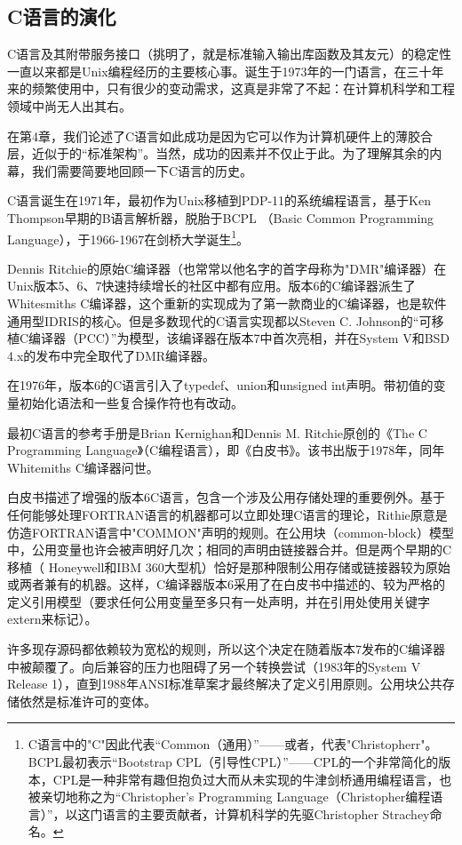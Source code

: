 \documentclass[12pt,oneside]{book}
\begin{document}
\begin{common-format}
\section{C语言的演化}
C语言及其附带服务接口（挑明了，就是标准输入输出库函数及其友元）的稳定性一直以来都是Unix编程经历的主要核心事。诞生于1973年的一门语言，在三十年来的频繁使用中，只有很少的变动需求，这真是非常了不起：在计算机科学和工程领域中尚无人出其右。

在第4章，我们论述了C语言如此成功是因为它可以作为计算机硬件上的薄胶合层，近似于\cite{BlaauwBrooks}的“标准架构”。当然，成功的因素并不仅止于此。为了理解其余的内幕，我们需要简要地回顾一下C语言的历史。

C语言诞生在1971年，最初作为Unix移植到PDP-11的系统编程语言，基于Ken Thompson早期的B语言解析器，脱胎于BCPL （Basic Common Programming Language），于1966-1967在剑桥大学诞生\footnote{C语言中的"C"因此代表“Common（通用）”——或者，代表"Christopherr"。BCPL最初表示“Bootstrap CPL（引导性CPL）”——CPL的一个非常简化的版本，CPL是一种非常有趣但抱负过大而从未实现的牛津剑桥通用编程语言，也被亲切地称之为“Christopher's Programming Language（Christopher编程语言）”，以这门语言的主要贡献者，计算机科学的先驱Christopher Strachey命名。}。

Dennis Ritchie的原始C编译器（也常常以他名字的首字母称为"DMR"编译器）在Unix版本5、6、7快速持续增长的社区中都有应用。版本6的C编译器派生了Whitesmiths C编译器，这个重新的实现成为了第一款商业的C编译器，也是软件通用型IDRIS的核心。但是多数现代的C语言实现都以Steven C. Johnson的“可移植C编译器（PCC）”为模型，该编译器在版本7中首次亮相，并在System V和BSD 4.x的发布中完全取代了DMR编译器。

在1976年，版本6的C语言引入了typedef、union和unsigned int声明。带初值的变量初始化语法和一些复合操作符也有改动。

最初C语言的参考手册是Brian Kernighan和Dennis M. Ritchie原创的《The C Programming Language》（C编程语言），即《白皮书》\cite{Kernighan-Ritchie}。该书出版于1978年，同年Whitemiths C编译器问世。

白皮书描述了增强的版本6C语言，包含一个涉及公用存储处理的重要例外。基于任何能够处理FORTRAN语言的机器都可以立即处理C语言的理论，Rithie原意是仿造FORTRAN语言中"COMMON"声明的规则。在公用块（common-block）模型中，公用变量也许会被声明好几次；相同的声明由链接器合并。但是两个早期的C移植（ Honeywell和IBM 360大型机）恰好是那种限制公用存储或链接器较为原始或两者兼有的机器。这样，C编译器版本6采用了在白皮书中描述的、较为严格的定义引用模型（要求任何公用变量至多只有一处声明，并在引用处使用关键字extern来标记）。

许多现存源码都依赖较为宽松的规则，所以这个决定在随着版本7发布的C编译器中被颠覆了。向后兼容的压力也阻碍了另一个转换尝试（1983年的System V Release 1），直到1988年ANSI标准草案才最终解决了定义引用原则。公用块公共存储依然是标准许可的变体。


\end{common-format}
\end{document}
